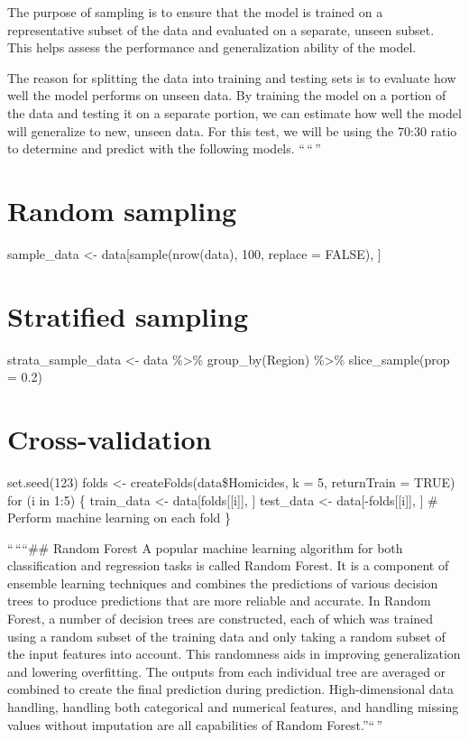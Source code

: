 \documentclass[
]{article}
\begin{document}
The purpose of sampling is to ensure that the model is trained on a
representative subset of the data and evaluated on a separate, unseen
subset. This helps assess the performance and generalization ability of
the model.

The reason for splitting the data into training and testing sets is to
evaluate how well the model performs on unseen data. By training the
model on a portion of the data and testing it on a separate portion, we
can estimate how well the model will generalize to new, unseen data. For
this test, we will be using the 70:30 ratio to determine and predict
with the following models. ``\,``\,''

\hypertarget{random-sampling}{%
\section{Random sampling}\label{random-sampling}}

sample\_data \textless- data{[}sample(nrow(data), 100, replace = FALSE),
{]}

\hypertarget{stratified-sampling}{%
\section{Stratified sampling}\label{stratified-sampling}}

strata\_sample\_data \textless- data \%\textgreater\% group\_by(Region)
\%\textgreater\% slice\_sample(prop = 0.2)

\hypertarget{cross-validation}{%
\section{Cross-validation}\label{cross-validation}}

set.seed(123) folds \textless- createFolds(data\$Homicides, k = 5,
returnTrain = TRUE) for (i in 1:5) \{ train\_data \textless-
data{[}folds{[}{[}i{]}{]}, {]} test\_data \textless-
data{[}-folds{[}{[}i{]}{]}, {]} \# Perform machine learning on each fold
\}

``\,````\#\# Random Forest A popular machine learning algorithm for both
classification and regression tasks is called Random Forest. It is a
component of ensemble learning techniques and combines the predictions
of various decision trees to produce predictions that are more reliable
and accurate. In Random Forest, a number of decision trees are
constructed, each of which was trained using a random subset of the
training data and only taking a random subset of the input features into
account. This randomness aids in improving generalization and lowering
overfitting. The outputs from each individual tree are averaged or
combined to create the final prediction during prediction.
High-dimensional data handling, handling both categorical and numerical
features, and handling missing values without imputation are all
capabilities of Random Forest.''``\,''
\end{document}
